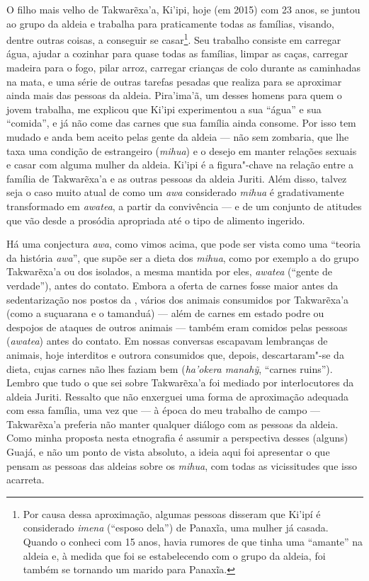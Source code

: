 O filho mais velho de Takwarẽxa'a, Ki'ipi, hoje (em 2015) com 23 anos,
se juntou ao grupo da aldeia e trabalha para praticamente todas as
famílias, visando, dentre outras coisas, a conseguir se casar\footnote{Por
  causa dessa aproximação, algumas pessoas disseram que Ki'ipí é
  considerado \emph{imena} (``esposo dela'') de Panaxĩa, uma mulher já
  casada. Quando o conheci com 15 anos, havia rumores de que tinha uma
  ``amante'' na aldeia e, à medida que foi se estabelecendo com o grupo da
  aldeia, foi também se tornando um marido para Panaxĩa.}. Seu trabalho
consiste em carregar água, ajudar a cozinhar para quase todas as
famílias, limpar as caças, carregar madeira para o fogo, pilar arroz,
carregar crianças de colo durante as caminhadas na mata, e uma série de
outras tarefas pesadas que realiza para se aproximar ainda mais das
pessoas da aldeia. Pira'ima'ã, um desses homens para quem o jovem
trabalha, me explicou que Ki'ipi experimentou a sua ``água'' e sua
``comida'', e já não come das carnes que sua família ainda consome. Por
isso tem mudado e anda bem aceito pelas gente da aldeia --- não sem
zombaria, que lhe taxa uma condição de estrangeiro (\emph{mihua}) e o
desejo em manter relações sexuais e casar com alguma mulher da aldeia.
Ki'ipi é a figura"-chave na relação entre a família de Takwarẽxa'a e as
outras pessoas da aldeia Juriti. Além disso, talvez seja o caso muito
atual de como um \emph{awa} considerado \emph{mihua} é gradativamente
transformado em \emph{awatea}, a partir da convivência --- e de um
conjunto de atitudes que vão desde a prosódia apropriada até o tipo de
alimento ingerido.

Há uma conjectura \emph{awa}, como vimos acima, que pode ser vista como
uma ``teoria da história \emph{awa}'', que supõe ser a dieta dos
\emph{mihua}, como por exemplo a do grupo Takwarẽxa'a ou dos isolados, a
mesma mantida por eles, \emph{awatea} (``gente de verdade''), antes do
contato. Embora a oferta de carnes fosse maior antes da sedentarização
nos postos da , vários dos animais consumidos por Takwarẽxa'a (como
a suçuarana e o tamanduá) --- além de carnes em estado podre ou despojos
de ataques de outros animais --- também eram comidos pelas pessoas
(\emph{awatea}) antes do contato. Em nossas conversas escapavam
lembranças de animais, hoje interditos e outrora consumidos que, depois,
descartaram"-se da dieta, cujas carnes não lhes faziam bem
(\emph{ha'okera manahỹ}, ``carnes ruins''). Lembro que tudo o que sei
sobre Takwarẽxa'a foi mediado por interlocutores da aldeia Juriti.
Ressalto que não enxerguei uma forma de aproximação adequada com essa
família, uma vez que --- à época do meu trabalho de campo --- Takwarẽxa'a
preferia não manter qualquer diálogo com as pessoas da aldeia. Como
minha proposta nesta etnografia é assumir a perspectiva desses (alguns)
Guajá, e não um ponto de vista absoluto, a ideia aqui foi apresentar o
que pensam as pessoas das aldeias sobre os \emph{mihua}, com todas as
vicissitudes que isso acarreta.

